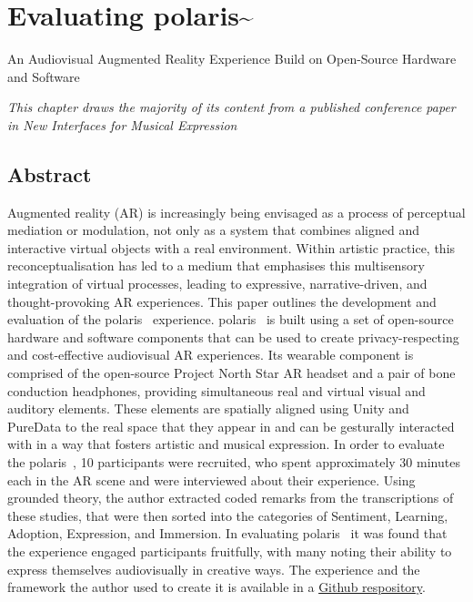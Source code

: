\chapter{Evaluating polaris\textasciitilde{}}{An Audiovisual Augmented Reality Experience Build on Open-Source Hardware and Software}


\epigraph{\emph{This chapter draws the majority of its content from a published conference paper in New Interfaces for Musical Expression}}{\citep[]{bilbow2021b}}



\section{Abstract}\label{sec: polaris-abstract}
Augmented reality (AR) is increasingly being envisaged as a process of perceptual mediation or modulation, not only as a system that combines aligned and interactive virtual objects with a real environment. Within artistic practice, this reconceptualisation has led to a medium that emphasises this multisensory integration of virtual processes, leading to expressive, narrative-driven, and thought-provoking AR experiences. This paper outlines the development and evaluation of the polaris~ experience. polaris~ is built using a set of open-source hardware and software components that can be used to create privacy-respecting and cost-effective audiovisual AR experiences. Its wearable component is comprised of the open-source Project North Star AR headset and a pair of bone conduction headphones, providing simultaneous real and virtual visual and auditory elements. These elements are spatially aligned using Unity and PureData to the real space that they appear in and can be gesturally interacted with in a way that fosters artistic and musical expression. In order to evaluate the polaris~, 10 participants were recruited, who spent approximately 30 minutes each in the AR scene and were interviewed about their experience. Using grounded theory, the author extracted coded remarks from the transcriptions of these studies, that were then sorted into the categories of Sentiment, Learning, Adoption, Expression, and Immersion. In evaluating polaris~ it was found that the experience engaged participants fruitfully, with many noting their ability to express themselves audiovisually in creative ways. The experience and the framework the author used to create it is available in a \href{https://github.com/sambilbow/polaris}{Github respository}.


